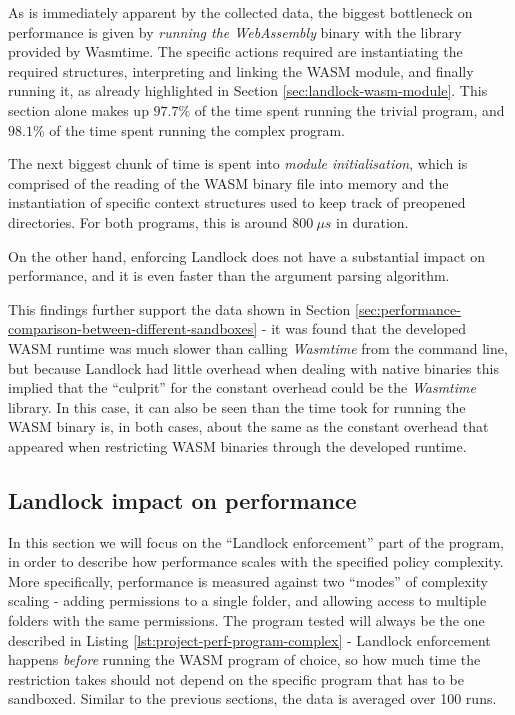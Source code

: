 As is immediately apparent by the collected data, the biggest bottleneck on performance is given
by \textit{running the WebAssembly} binary with the library provided by Wasmtime.
The specific actions required are instantiating the required structures, interpreting and linking the WASM module,
and finally running it, as already highlighted in Section \ref{sec:landlock-wasm-module}.
This section alone makes up $97.7 \%$ of the time spent running the trivial program, and $98.1 \%$ of the time
spent running the complex program.

The next biggest chunk of time is spent into \textit{module initialisation}, which is comprised of the
reading of the WASM binary file into memory and the instantiation of specific context structures used
to keep track of preopened directories. For both programs, this is around $800\ \mu s$ in duration.

On the other hand, enforcing Landlock does not have a substantial impact on performance,
and it is even faster than the argument parsing algorithm.

This findings further support the data shown in Section \ref{sec:performance-comparison-between-different-sandboxes} -
it was found that the developed WASM runtime was much slower than calling \textit{Wasmtime} from the command
line, but because Landlock had little overhead when dealing with native binaries this implied that
the ``culprit'' for the constant overhead could be the \textit{Wasmtime} library.
In this case, it can also be seen than the time took for running the WASM binary is, in both cases, about
the same as the constant overhead that appeared when restricting WASM binaries through the developed runtime.

\subsection{Landlock impact on performance}
\label{sec:performance-internal-analysis-landlock-impact}

In this section we will focus on the ``Landlock enforcement'' part of the program, in order to describe how
performance scales with the specified policy complexity. More specifically, performance is measured against
two ``modes'' of complexity scaling - adding permissions to a single folder, and allowing access to multiple folders
with the same permissions.
The program tested will always be the one described in Listing \ref{lst:project-perf-program-complex} - Landlock enforcement
happens \textit{before} running the WASM program of choice, so how much time the restriction takes should not
depend on the specific program that has to be sandboxed.
Similar to the previous sections, the data is averaged over 100 runs.

